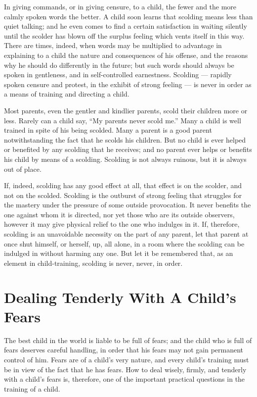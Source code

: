 \documentclass[
]{book}
\begin{document}
In giving commands, or in giving censure, to a child, the fewer and the more calmly spoken words the better. A child soon learns that scolding means less than quiet talking; and he even comes to find a certain satisfaction in waiting silently until the scolder has blown off the surplus feeling which vents itself in this way. There are times, indeed, when words may be multiplied to advantage in explaining to a child the nature and consequences of his offense, and the reasons why he should do differently in the future; but such words should always be spoken in gentleness, and in self-controlled earnestness. Scolding --- rapidly spoken censure and protest, in the exhibit of strong feeling --- is never in order as a means of training and directing a child.

Most parents, even the gentler and kindlier parents, scold their children more or less. Rarely can a child say, ``My parents never scold me.'' Many a child is well trained in spite of his being scolded. Many a parent is a good parent notwithstanding the fact that he scolds his children. But no child is ever helped or benefited by any scolding that he receives; and no parent ever helps or benefits his child by means of a scolding. Scolding is not always ruinous, but it is always out of place.

If, indeed, scolding has any good effect at all, that effect is on the scolder, and not on the scolded. Scolding is the outburst of strong feeling that struggles for the mastery under the pressure of some outside provocation. It never benefits the one against whom it is directed, nor yet those who are its outside observers, however it may give physical relief to the one who indulges in it. If, therefore, scolding is an unavoidable necessity on the part of any parent, let that parent at once shut himself, or herself, up, all alone, in a room where the scolding can be indulged in without harming any one. But let it be remembered that, as an element in child-training, scolding is never, never, in order.

\hypertarget{dealing-tenderly-with-a-childs-fears}{%
\chapter{Dealing Tenderly With A Child's Fears}\label{dealing-tenderly-with-a-childs-fears}}

The best child in the world is liable to be full of fears; and the child who is full of fears deserves careful handling, in order that his fears may not gain permanent control of him. Fears are of a child's very nature, and every child's training must be in view of the fact that he has fears. How to deal wisely, firmly, and tenderly with a child's fears is, therefore, one of the important practical questions in the training of a child.
\end{document}
